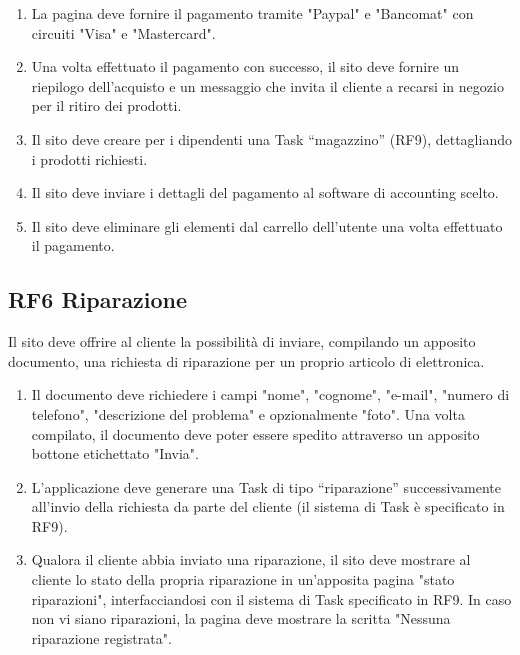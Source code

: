 \documentclass{report}
\begin{document}
\begin{enumerate}

	\item La pagina deve fornire il pagamento tramite "Paypal" e "Bancomat" con circuiti "Visa" e "Mastercard".

	\item Una volta effettuato il pagamento con successo, il sito deve fornire un riepilogo dell’acquisto e un messaggio che invita il cliente a recarsi in negozio per il ritiro dei prodotti.
	\item Il sito deve creare per i dipendenti una Task “magazzino” (RF9), dettagliando i prodotti richiesti.
	\item Il sito deve inviare i dettagli del pagamento al software di accounting scelto.
	\item Il sito deve eliminare gli elementi dal carrello dell’utente una volta effettuato il pagamento.
\end{enumerate}

\subsection*{RF6 Riparazione}

Il sito deve offrire al cliente la possibilità di inviare, compilando un apposito documento, una richiesta di riparazione per un proprio articolo di elettronica.
\begin{enumerate}


	\item Il documento deve richiedere i campi "nome", "cognome", "e-mail", "numero di telefono", "descrizione del problema" e opzionalmente "foto". Una volta compilato, il documento deve poter essere spedito attraverso un apposito bottone etichettato "Invia".
	
	\item L’applicazione deve generare una Task di tipo “riparazione” successivamente all’invio della richiesta da parte del cliente (il sistema di Task è specificato in RF9).
	
	\item Qualora il cliente abbia inviato una riparazione, il sito deve mostrare al cliente lo stato della propria riparazione in un'apposita pagina "stato riparazioni", interfacciandosi con il sistema di Task specificato in RF9. In caso non vi siano riparazioni, la pagina deve mostrare la scritta "Nessuna riparazione registrata".
	
\end{enumerate}
\end{document}
